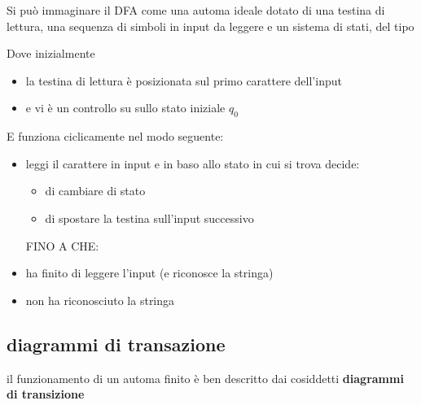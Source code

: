 Si può immaginare il DFA come una automa ideale dotato di una testina di lettura, una sequenza di simboli in input da leggere e un sistema di stati, del tipo


Dove inizialmente 
\begin{itemize}
    \item la testina di lettura è posizionata sul primo carattere dell'input
    \item e vi è un controllo su sullo stato iniziale $q_0$
\end{itemize}

E funziona ciclicamente nel modo seguente:
\begin{itemize}
    \item leggi il carattere in input e in baso allo stato in cui si trova decide:
    \begin{itemize}
        \item di cambiare di stato
        \item di spostare la testina sull'input successivo
    \end{itemize}
    FINO A CHE:
    \item ha finito di leggere l'input (e riconosce la stringa)
    \item non ha riconosciuto la stringa 
\end{itemize}

\subsection{diagrammi di transazione}
il funzionamento di un automa finito  è ben descritto dai cosiddetti \textbf{diagrammi di transizione}

\begin{center}
\end{center}


